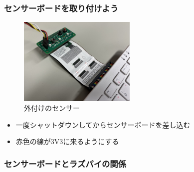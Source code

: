 \begin{frame}
  \frametitle{センサーボードを取り付けよう}
  \begin{figure}
    \centering
    \includegraphics[width=0.5\textwidth]{../images/chap03/how_to_install_bme280.jpg}
    \caption{外付けのセンサー}
  \end{figure}
  \begin{itemize}
    \item 一度シャットダウンしてからセンサーボードを差し込む
    \item 赤色の線が3V3に来るようにする
  \end{itemize}
\end{frame}

\begin{frame}
  \frametitle{センサーボードとラズパイの関係}
  \begin{figure}
    
  \end{figure}
\end{frame}



